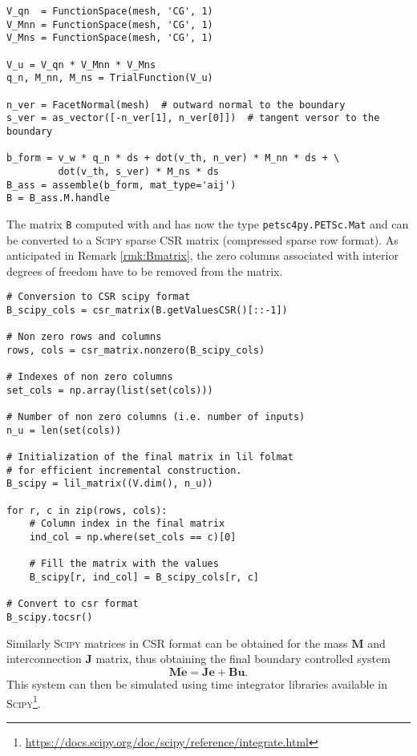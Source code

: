 \begin{tcolorbox}[title = Control matrix construction in  \firedrake, coltitle=black, breakable, size=fbox, boxrule=1pt, pad at break*=1mm, colframe=cyan, enlarge top by=0.25em, enlarge bottom by=0.5em]
\begin{Verbatim}[tabsize=4]
V_qn  = FunctionSpace(mesh, 'CG', 1)
V_Mnn = FunctionSpace(mesh, 'CG', 1)
V_Mns = FunctionSpace(mesh, 'CG', 1)

V_u = V_qn * V_Mnn * V_Mns
q_n, M_nn, M_ns = TrialFunction(V_u)

n_ver = FacetNormal(mesh)  # outward normal to the boundary
s_ver = as_vector([-n_ver[1], n_ver[0]])  # tangent versor to the boundary

b_form = v_w * q_n * ds + dot(v_th, n_ver) * M_nn * ds + \
		 dot(v_th, s_ver) * M_ns * ds
B_ass = assemble(b_form, mat_type='aij')
B = B_ass.M.handle
\end{Verbatim}
\end{tcolorbox}

The matrix \verb|B| computed with \fenics and \firedrake has now the type \verb|petsc4py.PETSc.Mat| and can be converted to a \textsc{Scipy} sparse CSR matrix (compressed sparse row format). As anticipated in Remark \ref{rmk:Bmatrix}, the zero columns associated with interior degrees of freedom have to be removed from the matrix.
\begin{tcolorbox}[title = Construction of the final $\mathbf{B}$ matrix (\textsc{Scipy}), coltitle=black, breakable, size=fbox, boxrule=1pt, pad at break*=1mm, colframe=green, enlarge top by=0.25em, enlarge bottom by=0.5em]
\begin{Verbatim}[tabsize=4]
# Conversion to CSR scipy format
B_scipy_cols = csr_matrix(B.getValuesCSR()[::-1])

# Non zero rows and columns
rows, cols = csr_matrix.nonzero(B_scipy_cols)

# Indexes of non zero columns
set_cols = np.array(list(set(cols)))

# Number of non zero columns (i.e. number of inputs)
n_u = len(set(cols))

# Initialization of the final matrix in lil folmat
# for efficient incremental construction.
B_scipy = lil_matrix((V.dim(), n_u))

for r, c in zip(rows, cols):
	# Column index in the final matrix
	ind_col = np.where(set_cols == c)[0]
	
	# Fill the matrix with the values
	B_scipy[r, ind_col] = B_scipy_cols[r, c]
	
# Convert to csr format
B_scipy.tocsr()	
\end{Verbatim}
\end{tcolorbox}
Similarly \textsc{Scipy} matrices in CSR format can be obtained for the mass $\mathbf{M}$ and interconnection $\mathbf{J}$ matrix, thus obtaining the final boundary controlled system
\begin{equation*}
\mathbf{M} \dot{\mathbf{e}} = \mathbf{J} \mathbf{e} + \mathbf{B} \mathbf{u}.
\end{equation*}
This system can then be simulated using time integrator libraries available in \textsc{Scipy}\footnote{\url{https://docs.scipy.org/doc/scipy/reference/integrate.html}}.

